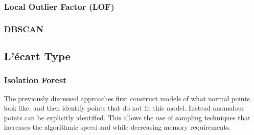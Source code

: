 \subsubsection*{Local Outlier Factor (LOF)}

\subsubsection*{DBSCAN}

\subsection{L’écart Type}

\subsubsection*{Isolation Forest \cite{A15}}

The previously discussed approaches first construct models of what normal points look like, and then identify points that do not fit this model.
Instead anomalous points can be explicitly identified.
This allows the use of sampling techniques that increases the algorithmic speed and while decreasing memory requirements.